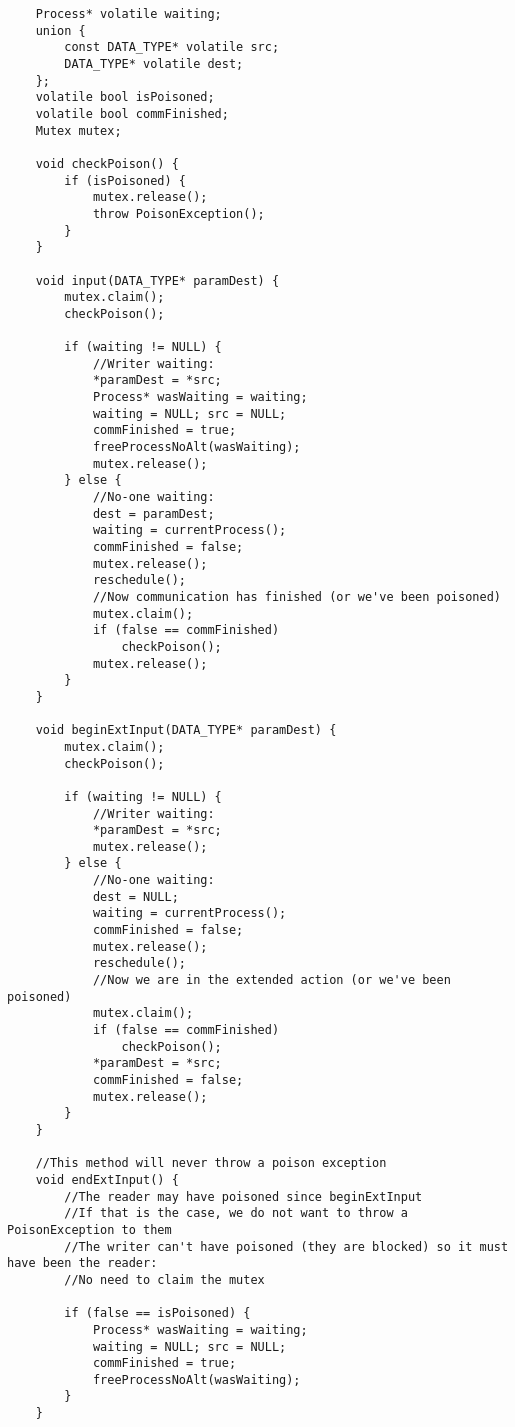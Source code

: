\documentclass{article}
\begin{document}
{\small\begin{verbatim}
    Process* volatile waiting;
    union {
        const DATA_TYPE* volatile src;
        DATA_TYPE* volatile dest;
    };
    volatile bool isPoisoned;
    volatile bool commFinished;
    Mutex mutex;

    void checkPoison() {
        if (isPoisoned) {
            mutex.release();
            throw PoisonException();
        }
    }

    void input(DATA_TYPE* paramDest) {
        mutex.claim();
        checkPoison();        

        if (waiting != NULL) {
            //Writer waiting:
            *paramDest = *src;
            Process* wasWaiting = waiting;
            waiting = NULL; src = NULL;
            commFinished = true;
            freeProcessNoAlt(wasWaiting);
            mutex.release();
        } else {
            //No-one waiting:
            dest = paramDest;
            waiting = currentProcess();
            commFinished = false;
            mutex.release();
            reschedule();
            //Now communication has finished (or we've been poisoned)
            mutex.claim();
            if (false == commFinished)
                checkPoison();
            mutex.release();
        }
    }

    void beginExtInput(DATA_TYPE* paramDest) {
        mutex.claim();
        checkPoison();

        if (waiting != NULL) {
            //Writer waiting:
            *paramDest = *src;
            mutex.release();
        } else {
            //No-one waiting:
            dest = NULL;
            waiting = currentProcess();
            commFinished = false;
            mutex.release();
            reschedule();
            //Now we are in the extended action (or we've been poisoned)
            mutex.claim();
            if (false == commFinished)
                checkPoison();             
            *paramDest = *src;
            commFinished = false;
            mutex.release();
        }
    }

    //This method will never throw a poison exception
    void endExtInput() {
        //The reader may have poisoned since beginExtInput
        //If that is the case, we do not want to throw a PoisonException to them
        //The writer can't have poisoned (they are blocked) so it must have been the reader:
        //No need to claim the mutex

        if (false == isPoisoned) {
            Process* wasWaiting = waiting;
            waiting = NULL; src = NULL;
            commFinished = true;
            freeProcessNoAlt(wasWaiting);
        }
    }


\end{verbatim}}
\end{document}
